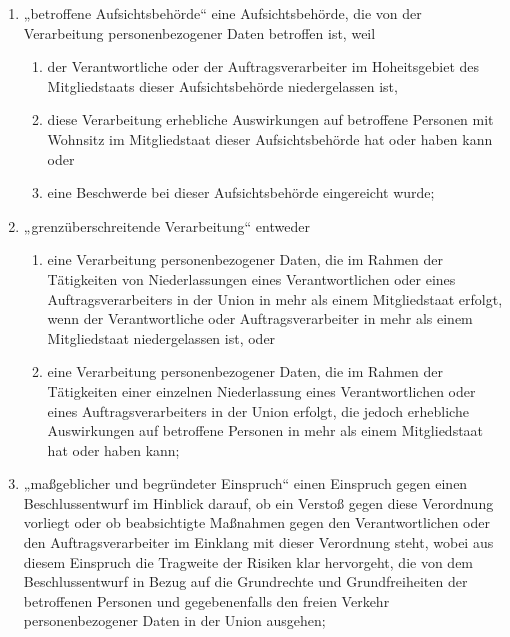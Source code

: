 \begin{enumerate}
  \item „betroffene Aufsichtsbehörde“ eine Aufsichtsbehörde, die von der Verarbeitung personenbezogener Daten betroffen
   ist, weil
  \label{itm:04-22}

  \begin{enumerate}

    \item der Verantwortliche oder der Auftragsverarbeiter im Hoheitsgebiet des Mitgliedstaats dieser Aufsichtsbehörde
     niedergelassen ist,
    \label{itm:04-22a}

    \item diese Verarbeitung erhebliche Auswirkungen auf betroffene Personen mit Wohnsitz im Mitgliedstaat dieser
     Aufsichtsbehörde hat oder haben kann oder
    \label{itm:04-22b}

    \item eine Beschwerde bei dieser Aufsichtsbehörde eingereicht wurde;
  \label{itm:04-22c}

  \end{enumerate}

  \item „grenzüberschreitende Verarbeitung“ entweder
  \label{itm:04-23}

  \begin{enumerate}

    \item eine Verarbeitung personenbezogener Daten, die im Rahmen der Tätigkeiten von Niederlassungen eines
     Verantwortlichen oder eines Auftragsverarbeiters in der Union in mehr als einem Mitgliedstaat erfolgt, wenn der
     Verantwortliche oder Auftragsverarbeiter in mehr als einem Mitgliedstaat niedergelassen ist, oder
    \label{itm:04-23a}

    \item eine Verarbeitung personenbezogener Daten, die im Rahmen der Tätigkeiten einer einzelnen Niederlassung eines
     Verantwortlichen oder eines Auftragsverarbeiters in der Union erfolgt, die jedoch erhebliche Auswirkungen auf
     betroffene Personen in mehr als einem Mitgliedstaat hat oder haben kann;
    \label{itm:04-23b}

  \end{enumerate}

  \item „maßgeblicher und begründeter Einspruch“ einen Einspruch gegen einen Beschlussentwurf im Hinblick darauf, ob ein
   Verstoß gegen diese Verordnung vorliegt oder ob beabsichtigte Maßnahmen gegen den Verantwortlichen oder den
   Auftragsverarbeiter im Einklang mit dieser Verordnung steht, wobei aus diesem Einspruch die Tragweite der Risiken
   klar hervorgeht, die von dem Beschlussentwurf in Bezug auf die Grundrechte und Grundfreiheiten der betroffenen
   Personen und gegebenenfalls den freien Verkehr personenbezogener Daten in der Union ausgehen;
  \label{itm:04-27}
 

\end{enumerate}
